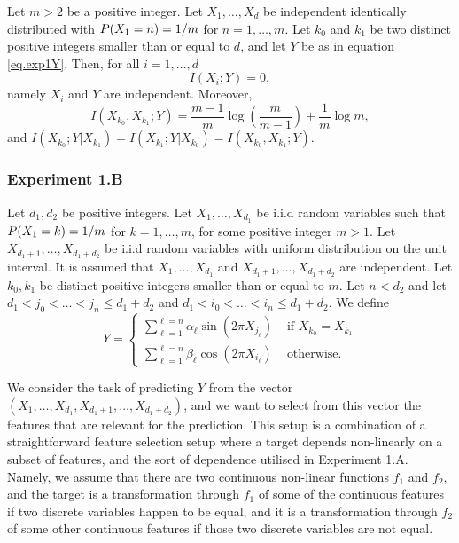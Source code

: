 \begin{lemma}
	\label{lemma.experiment1}
	Let $m>2$ be a positive integer. 
	Let
	$X_1, \dots, X_d$
	be independent identically distributed
	with 
	${{P}}(X_1 = n) = 1 / m$
	for $n=1, \dots, m$. 
	Let 
	$k_0$ and $k_1$ 
	be two distinct positive integers 
	smaller than or equal to $d$,
	and let $Y$
	be as in equation \eqref{eq.exp1Y}.
	Then,
	for all $i=1, \dots, d$
	\begin{equation}
		\label{eq.exp1pairwisemi}
		I(X_i; Y) = 0,
	\end{equation}
	namely $X_i$ and $Y$ are independent. 
	Moreover,
	\begin{equation}
		\label{eq.exp1mi}
		I(X_{k_0}, X_{k_1}; Y) 
		=
			\frac{m-1}{m} \log\left(\frac{m}{m-1}\right)
			+
			\frac{1}{m}\log m
			,
	\end{equation}
	and $I(X_{k_0}; Y \lvert X_{k_1}) = I(X_{k_1}; Y \lvert X_{k_0})  = I(X_{k_0}, X_{k_1} ; Y)$.
\end{lemma}




\subsubsection{Experiment 1.B}

Let 
$d_1, d_2$
be positive integers.
Let
$X_1, \dots, X_{d_1}$
be i.i.d random variables
such that
${{P}}(X_1 = k) = 1/m$
for $k=1, \dots, m$,
for some positive integer 
$m > 1$.
Let 
$X_{d_1 + 1}, \dots, X_{d_1 + d_2}$
be i.i.d random variables with uniform distribution on the unit interval. 
It is assumed that 
$X_1, \dots, X_{d_1}$
and
$X_{d_1 + 1}, \dots, X_{d_1 + d_2}$
are independent. 
Let 
$k_0, k_1$
be distinct positive integers 
smaller than or equal to
$m$.
Let 
$n < d_2$
and 
let
$d_1 < j_0 <  \dots < j_n \leq d_1 + d_2$
and
$d_1 < i_0 <  \dots < i_n \leq d_1 + d_2$.
We define
\begin{equation}
	\label{eq.exp2target}
	Y 
	=
	\begin{cases}
		\sum_{\ell = 1}^{\ell=n} \alpha_\ell \sin\left(2\pi X_{j_\ell}\right)  
		& \text{ if } X_{k_0} = X_{k_1}
		\\
		\sum_{\ell = 1}^{\ell=n} \beta_\ell \cos\left(2\pi X_{i_\ell}\right)  
		& \text{ otherwise}.
	\end{cases}
\end{equation}



We consider the task of predicting $Y$ from the vector 
$(X_1, \dots, X_{d_1}, X_{d_1 + 1}, \dots, X_{d_1 + d_2})$,
and 
we want to select 
from this vector 
the features that are relevant for the prediction.
This setup is a combination of a 
straightforward feature selection setup 
where a target depends non-linearly on a subset of features,
and 
the sort of dependence utilised in Experiment 1.A.
Namely,
we assume that 
there are two continuous non-linear functions $f_1$ and $f_2$,
and
the target is a transformation through $f_1$
of some of the continuous features if two discrete  variables happen to be equal,
and it is a transformation through $f_2$
of some other continuous features if those two discrete variables are not equal. 

